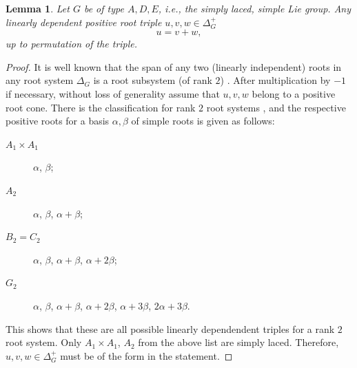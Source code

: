 \documentclass{amsart}
\newtheorem{lemma}[theorem]{Lemma}
\theoremstyle{definition}
\theoremstyle{remark}
\numberwithin{equation}{section}
\begin{document}
\begin{lemma}\label{lm:triprk2}
Let $G$ be of type $A, D, E$, i.e., the simply laced, simple Lie group.
Any linearly dependent positive root triple 
$u,v,w\in \Delta_{G}^{+}$ 
\[
u=v+w,
\]
up to permutation of the triple.
\end{lemma}
\begin{proof}
It is well known that the span of any two (linearly independent) roots in any root system $\Delta_{G}$ is a root subsystem (of rank $2$) \cite[Section 9.4]{H72}.
After multiplication by $-1$ if necessary, without loss of generality assume that $u,v,w$ belong to a positive root cone.
There is the classification for rank $2$ root systems \cite[Section 9.4]{H72}, and the respective positive roots for a basis $\alpha,\beta$ of simple roots is given as follows:
\begin{description}
\item[$A_{1}\times A_{1}$] $\alpha$, $\beta$;
\item[$A_{2}$] $\alpha$, $\beta$, $\alpha+\beta$;
\item[$B_{2}=C_{2}$] $\alpha$, $\beta$, $\alpha+\beta$, $\alpha+2\beta$;
\item[$G_{2}$] $\alpha$, $\beta$, $\alpha+\beta$, $\alpha+2\beta$, $\alpha+3\beta$, $2\alpha+3\beta$.
\end{description}
This shows that these are all possible linearly dependendent triples for a rank $2$ root system.
Only $A_{1}\times A_{1}$, $A_{2}$ from the above list are simply laced.
Therefore, $u,v,w\in \Delta_{G}^{+}$ must be of the form in the statement.
\end{proof}

\end{document}
